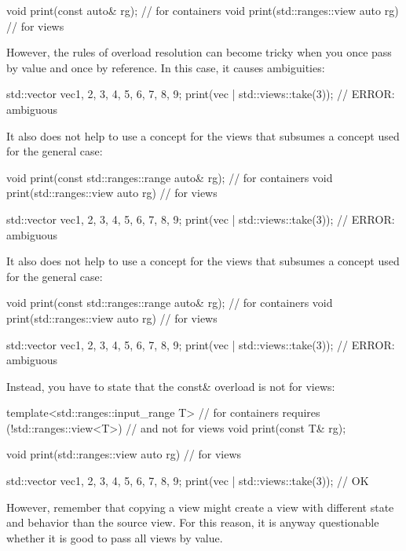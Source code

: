 \begin{cpp}
void print(const auto& rg); // for containers
void print(std::ranges::view auto rg) // for views
\end{cpp}

However, the rules of overload resolution can become tricky when you once pass by value and once by reference. In this case, it causes ambiguities:

\begin{cpp}
std::vector vec{1, 2, 3, 4, 5, 6, 7, 8, 9};
print(vec | std::views::take(3)); // ERROR: ambiguous
\end{cpp}

It also does not help to use a concept for the views that subsumes a concept used for the general case:

\begin{cpp}
void print(const std::ranges::range auto& rg); // for containers
void print(std::ranges::view auto rg) // for views

std::vector vec{1, 2, 3, 4, 5, 6, 7, 8, 9};
print(vec | std::views::take(3)); // ERROR: ambiguous
\end{cpp}

It also does not help to use a concept for the views that subsumes a concept used for the general case:

\begin{cpp}
void print(const std::ranges::range auto& rg); // for containers
void print(std::ranges::view auto rg) // for views

std::vector vec{1, 2, 3, 4, 5, 6, 7, 8, 9};
print(vec | std::views::take(3)); // ERROR: ambiguous
\end{cpp}

Instead, you have to state that the const\& overload is not for views:

\begin{cpp}
template<std::ranges::input_range T> // for containers
requires (!std::ranges::view<T>) // and not for views
void print(const T& rg);

void print(std::ranges::view auto rg) // for views

std::vector vec{1, 2, 3, 4, 5, 6, 7, 8, 9};
print(vec | std::views::take(3)); // OK
\end{cpp}

However, remember that copying a view might create a view with different state and behavior than the source view. For this reason, it is anyway questionable whether it is good to pass all views by value.

